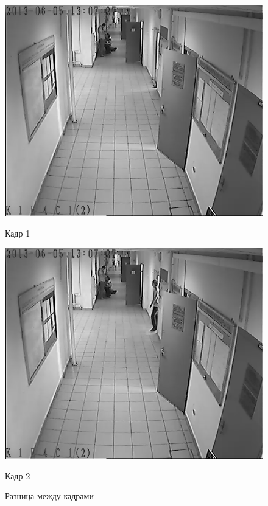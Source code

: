\begin{figure}[!htb]
	\includegraphics[width=\linewidth]{img/frame_1.png}
	\caption{Кадр 1}
	\label{motion_detection_1}
\endminipage\hfill
{}
	\includegraphics[width=\linewidth]{img/frame_2.png}
	\caption{Кадр 2}
	\label{motion_detection_2}
\endminipage

\def\svgwidth{\columnwidth}
\caption{Разница между кадрами}
\label{motion_detection_3}
\end{figure}


